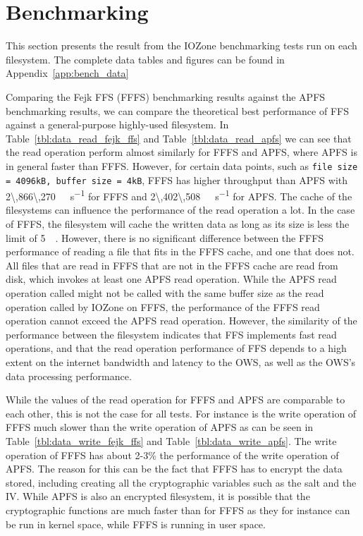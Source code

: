 \section{Benchmarking}
\label{sec:res_bench}
This section presents the result from the IOZone benchmarking tests run on each filesystem. The complete data tables and figures can be found in Appendix~\ref{app:bench_data}


Comparing the Fejk FFS (FFFS) benchmarking results against the APFS benchmarking results, we can compare the theoretical best performance of FFS against a general-purpose highly-used filesystem. In Table~\ref{tbl:data_read_fejk_ffs} and Table~\ref{tbl:data_read_apfs} we can see that the read operation perform almost similarly for FFFS and APFS, where APFS is in general faster than FFFS. However, for certain data points, such as \texttt{file size = 4096kB, buffer size = 4kB}, FFFS has higher throughput than APFS with \SI[per-mode = symbol]{2\,866\,270}{\kilo\byte\per\second} for FFFS and \SI[per-mode = symbol]{2\,402\,508}{\kilo\byte\per\second} for APFS. The cache of the filesystems can influence the performance of the read operation a lot. In the case of FFFS, the filesystem will cache the written data as long as its size is less the limit of \SI{5}{\mega\byte}. However, there is no significant difference between the FFFS performance of reading a file that fits in the FFFS cache, and one that does not. All files that are read in FFFS that are not in the FFFS cache are read from disk, which invokes at least one APFS read operation. While the APFS read operation called might not be called with the same buffer size as the read operation called by IOZone on FFFS, the performance of the FFFS read operation cannot exceed the APFS read operation. However, the similarity of the performance between the filesystem indicates that FFS implements fast read operations, and that the read operation performance of FFS depends to a high extent on the internet bandwidth and latency to the OWS, as well as the OWS's data processing performance.

While the values of the read operation for FFFS and APFS are comparable to each other, this is not the case for all tests. For instance is the write operation of FFFS much slower than the write operation of APFS as can be seen in Table~\ref{tbl:data_write_fejk_ffs} and Table~\ref{tbl:data_write_apfs}. The write operation of FFFS has about 2-3\% the performance of the write operation of APFS. The reason for this can be the fact that FFFS has to encrypt the data stored, including creating all the cryptographic variables such as the salt and the IV. While APFS is also an encrypted filesystem, it is possible that the cryptographic functions are much faster than for FFFS as they for instance can be run in kernel space, while FFFS is running in user space.